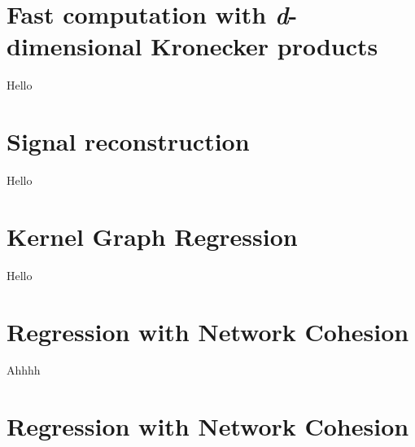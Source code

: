 \section{Fast computation with \textit{d}-dimensional Kronecker products}

Hello

\section{Signal reconstruction}

Hello

\section{Kernel Graph Regression}

Hello

\section{Regression with Network Cohesion}

Ahhhh

\section{Regression with Network Cohesion}